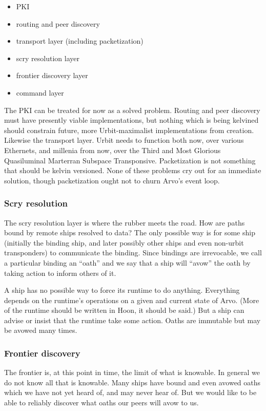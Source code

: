 \begin{itemize}
\item PKI
\item routing and peer discovery
\item transport layer (including packetization)
\item scry resolution layer
\item frontier discovery layer
\item command layer
\end{itemize}

The PKI can be treated for now as a solved problem. Routing and peer
discovery must have presently viable implementations, but nothing which
is being kelvined should constrain future, more Urbit-maximalist
implementations from creation. Likewise the transport layer. Urbit needs
to function both now, over various Ethernets, and millenia from now,
over the Third and Most Glorious Quasiluminal Marterran Subspace
Transponsive. Packetization is not something that should be kelvin
versioned. None of these problems cry out for an immediate solution,
though packetization ought not to churn Arvo's event loop.

\subsubsection{Scry resolution}

The scry resolution layer is where the rubber meets the road. How are
paths bound by remote ships resolved to data? The only possible way is
for some ship (initially the binding ship, and later possibly other
ships and even non-urbit transponders) to communicate the binding. Since
bindings are irrevocable, we call a particular binding an ``oath'' and
we say that a ship will ``avow'' the oath by taking action to inform
others of it.

A ship has no possible way to force its runtime to do anything.
Everything depends on the runtime's operations on a given and current
state of Arvo. (More of the runtime should be written in Hoon, it should
be said.) But a ship can advise or insist that the runtime take some
action. Oaths are immutable but may be avowed many times.

\subsubsection{Frontier discovery}

The frontier is, at this point in time, the limit of what is knowable.
In general we do not know all that is knowable. Many ships have bound
and even avowed oaths which we have not yet heard of, and may never hear
of. But we would like to be able to reliably discover what oaths our
peers will avow to us.

